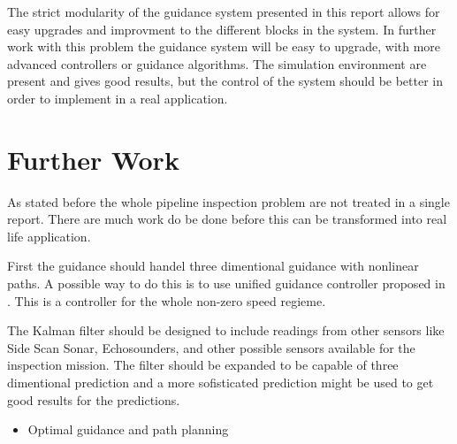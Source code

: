 	The strict modularity of the guidance system presented in this report allows for easy upgrades and
	improvment to the different blocks in the system. In further work with this problem the guidance
	system will be easy to upgrade, with more advanced controllers or guidance algorithms. The simulation
	environment are present and gives good results, but the control of the system should be better in
	order to implement in a real application.

	
\section{Further Work}
	As stated before the whole pipeline inspection problem are not treated in a single report. There are
	much work do be done before this can be transformed into real life application.
	
	First the guidance should handel three dimentional guidance with nonlinear paths. A possible way to 
	do this is to use unified guidance controller proposed in \cite{control-concept-AUV}. This is a 
	controller for the whole non-zero speed regieme.

	The Kalman filter should be designed to include readings from other sensors like Side Scan Sonar,
	Echosounders, and other possible sensors available for the inspection mission. The filter should be
	expanded to be capable of three dimentional prediction and a more sofisticated prediction might be
	used to get good results for the predictions. 

	

	\begin{itemize}
		\item Optimal guidance and path planning
	\end{itemize}


